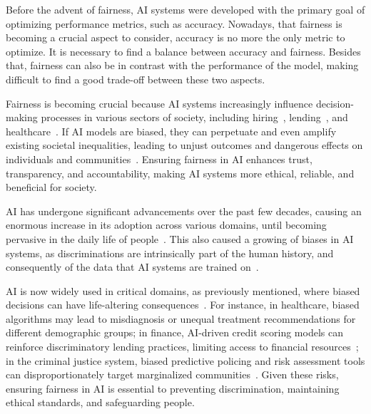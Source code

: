 \documentclass[12pt,a4paper,openright,twoside]{book}
\begin{document}
Before the advent of fairness, \ac{AI} systems were developed with the primary goal of optimizing performance metrics, such as accuracy.
%
Nowadays, that fairness is becoming a crucial aspect to consider, accuracy is no more the only metric to optimize.
%
It is necessary to find a balance between accuracy and fairness.
%
Besides that, fairness can also be in contrast with the performance of the model, making difficult to find a good trade-off between these two aspects.

Fairness is becoming crucial because \ac{AI} systems increasingly influence decision-making processes in various sectors of society, including hiring~\cite{fairness-recruitment}, lending~\cite{fairness-lending}, and healthcare~\cite{fairness-healthcare}.
%
If \ac{AI} models are biased, they can perpetuate and even amplify existing societal inequalities, leading to unjust outcomes and dangerous effects on individuals and communities~\cite{fairness-survey}.
%
Ensuring fairness in \ac{AI} enhances trust, transparency, and accountability, making \ac{AI} systems more ethical, reliable, and beneficial for society.

\ac{AI} has undergone significant advancements over the past few decades, causing an enormous increase in its adoption across various domains, until becoming pervasive in the daily life of people~\cite{fairness-survey}.
%
This also caused a growing of biases in \ac{AI} systems, as discriminations are intrinsically part of the human history, and consequently of the data that \ac{AI} systems are trained on~\cite{fairness-survey}.



\ac{AI} is now widely used in critical domains, as previously mentioned, where biased decisions can have life-altering consequences~\cite{fairness-survey}.
%
For instance, in healthcare, biased algorithms may lead to misdiagnosis or unequal treatment recommendations for different demographic groups;
%
in finance, \ac{AI}-driven credit scoring models can reinforce discriminatory lending practices, limiting access to financial resources~\cite{fairness-lending};
%
in the criminal justice system, biased predictive policing and risk assessment tools can disproportionately target marginalized communities~\cite{fairness-crime}.
%
Given these risks, ensuring fairness in \ac{AI} is essential to preventing discrimination, maintaining ethical standards, and safeguarding people.
\end{document}
